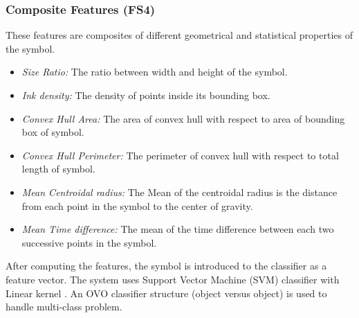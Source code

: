 \documentclass[preprint,10pt,5p,twocolumn]{elsarticle}
\begin{document}
\subsubsection{Composite Features (FS4)}
 These features are composites of different geometrical and statistical properties of the symbol. 
	\begin{itemize}
\item \emph{Size Ratio:} The ratio between width and height of the symbol.
	\item \emph{Ink density:} The density of points inside its bounding box\cite{GeometryAndDomain102}.   
 	\item \emph{Convex Hull Area:} The area of convex hull with respect to area of bounding box of symbol.
	\item \emph{Convex Hull Perimeter:} The perimeter of convex hull with respect to total length of symbol.
		\item \emph{Mean Centroidal radius:} The Mean of the centroidal radius is the distance from each point in the symbol to the center of gravity.
	\item \emph{Mean Time difference:} The mean of the time difference between each two successive points in the symbol. 
  \end{itemize}  
 
 After computing the features, the symbol is introduced to the classifier as a feature vector. The system uses Support Vector Machine (SVM) classifier with Linear kernel \cite{libsvm}. An OVO classifier structure (object versus object) is used to handle multi-class problem.%
\end{document}
